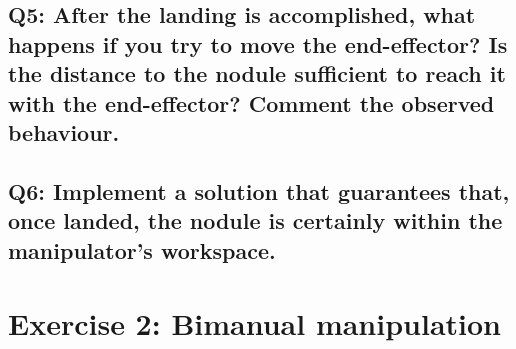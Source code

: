 \documentclass{article}
\begin{document}
\subsection{Q5: After the landing is accomplished, what happens if you try to move the end-effector? Is the distance to the nodule sufficient to reach it with the end-effector? Comment the observed behaviour.}

\subsection{Q6: Implement a solution that guarantees that, once landed, the nodule is certainly within the manipulator's workspace.}

\clearpage
\section{Exercise 2: Bimanual manipulation}
\end{document}
